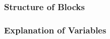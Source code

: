 \vspace{5mm}
\subsubsection{Structure of Blocks}



\vspace{5mm}
\subsubsection{Explanation of Variables}
\begin{description}

\end{description}
